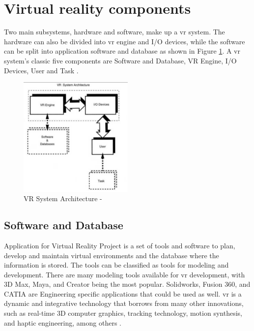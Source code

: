 

\section{Virtual reality components}



Two main subsystems, hardware and software, make up a \acrshort{vr} system. The hardware can also be divided into \acrshort{vr} engine and I/O devices, while the software can be split into application software and database as shown in Figure \ref{fig:sys}. A \acrshort{vr} system's classic five components are Software and Database, VR Engine, I/O Devices, User and Task \citep{burdea2017virtual,Bamodu2013VirtualComponents}.

\begin{figure}[ht]
    \centering
    \includegraphics[width=0.50\textwidth]{images/VR.png}
    \caption{VR System Architecture - \citep{burdea2017virtual}}
    \label{fig:sys}
\end{figure}


\subsection{Software and Database}
Application for Virtual Reality Project is a set of tools and software to plan, develop and maintain virtual environments and the database where the information is stored. The tools can be classified as tools for modeling and development. There are many modeling tools available for \acrshort{vr} development, with 3D Max, Maya, and Creator being the most popular. Solidworks, Fusion 360, and CATIA are Engineering specific applications that could be used as well. \acrshort{vr} is a dynamic and integrative technology that borrows from many other innovations, such as real-time 3D computer graphics, tracking technology, motion synthesis, and haptic engineering, among others \citep{burdea2017virtual, Bamodu2013VirtualComponents}.


